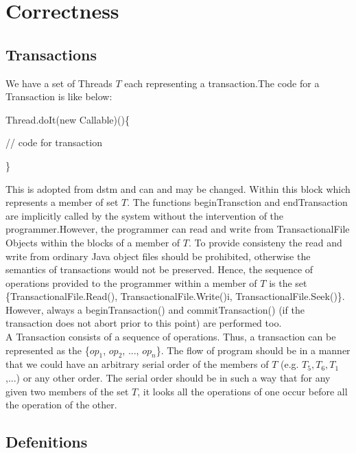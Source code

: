 \documentclass[a4paper, 11pt]{article}
\begin{document}
\tableofcontents
\section{Correctness}
\subsection{Transactions}
We have a set of Threads $T$ each representing a transaction.The code for a 
Transaction is like below:

\hspace{12mm}	Thread.doIt(new Callable)()\{

\hspace{12mm}		// code for transaction

\hspace{12mm}	\}

This is adopted from dstm and can and may be changed. Within this block which represents a member of set $T$. The functions beginTransction and endTransaction are implicitly called by the system without the intervention of the programmer.However, the programmer can read and write from TransactionalFile Objects within the blocks of a member of $T$. To provide consisteny the read and write from ordinary Java object files should be prohibited, otherwise the semantics of transactions would not be preserved. Hence, the sequence of operations provided to the programmer within a member of $T$ is the set \{TransactionalFile.Read(), TransactionalFile.Write()i, TransactionalFile.Seek()\}. However, always a beginTransaction() and commitTransaction() (if the transaction does not abort prior to this point) are performed too. \\ 

A Transaction consists of a sequence of operations. Thus, a transaction can be represented as the \{$op_1$, $op_2$, ..., $op_n$\}. The flow of program should be in a manner that we could have an arbitrary serial order of the members of $T$ (e.g. $T_5,T_6,T_1$,...) or any other order. The serial order should be in such a way that for any given two members of the set $T$, it looks all the operations of one occur before all the operation of the other. %

\subsection{Defenitions}
\end{document}
